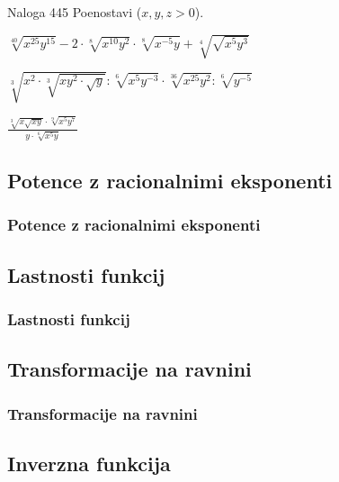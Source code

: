         \begin{frame}
            \begin{exampleblock}{Naloga 445}
                Poenostavi ($x,y,z>0$).
                \begin{description}
                    \item<2->[(g)] $\displaystyle \sqrt[40]{x^{25}y^{15}}-2\cdot\sqrt[8]{x^{10}y^2}\cdot\sqrt[8]{x^{-5}y}+\sqrt[4]{\sqrt{x^5y^3}}$
                    \item<3->[(m)] $\displaystyle \sqrt[3]{x^2\cdot\sqrt[3]{xy^2\cdot\sqrt{y}}}:\sqrt[6]{x^5y^{-3}}\cdot\sqrt[36]{x^{25}y^2}:\sqrt[6]{y^{-5}}$
                    \item<4->[(o)] $\displaystyle \frac{\sqrt[3]{x\sqrt{xy}}\cdot\sqrt[9]{x^5y^7}}{y\cdot\sqrt[6]{x^5y}}$  
                \end{description}
            \end{exampleblock}

        \end{frame}

    \subsection{Potence z racionalnimi eksponenti}

        \begin{frame}
            \frametitle{Potence z racionalnimi eksponenti}
        \end{frame}

    \subsection{Lastnosti funkcij}

        \begin{frame}
            \frametitle{Lastnosti funkcij}
        \end{frame}

    \subsection{Transformacije na ravnini}

        \begin{frame}
            \frametitle{Transformacije na ravnini}
        \end{frame}

    \subsection{Inverzna funkcija}

